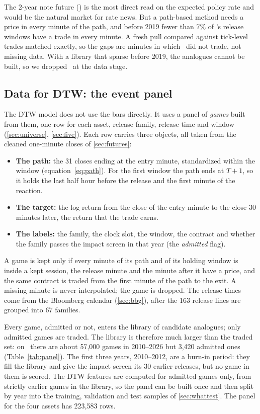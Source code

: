 The 2-year note future (\ZT) is the most direct read on the expected policy rate and would be the
natural market for rate news. But a path-based method needs a price in every minute of the path,
and before 2019 fewer than 7\% of \ZT's release windows have a trade in every minute. A fresh
pull compared against tick-level trades matched exactly, so the gaps are minutes in which \ZT\ did
not trade, not missing data. With a library that sparse before 2019, the analogues cannot be
built, so we dropped \ZT\ at the data stage.

\subsection{Data for DTW: the event panel}\label{sec:dtwdata}

The DTW model does not use the bars directly. It uses a panel of \emph{games} built from them, one
row for each asset, release family, release time and window (\ref{sec:universe}, \ref{sec:five}).
Each row carries three objects, all taken from the cleaned one-minute closes of
\ref{sec:futures}:
\begin{itemize}\itemsep0pt
  \item \textbf{The path:} the 31 closes ending at the entry minute, standardized within the
  window (equation~\eqref{eq:path}). For the first window the path ends at $T+1$, so it holds the
  last half hour before the release and the first minute of the reaction.
  \item \textbf{The target:} the log return from the close of the entry minute to the close 30
  minutes later, the return that the trade earns.
  \item \textbf{The labels:} the family, the clock slot, the window, the contract and whether the
  family passes the impact screen in that year (the \emph{admitted} flag).
\end{itemize}
A game is kept only if every minute of its path and of its holding window is inside a kept session,
the release minute and the minute after it have a price, and the same contract is traded from the
first minute of the path to the exit. A missing minute is never interpolated; the game is dropped.
The release times come from the Bloomberg calendar (\ref{sec:bbg}), after the 163 release lines
are grouped into 67 families.

Every game, admitted or not, enters the library of candidate analogues; only admitted games are
traded. The library is therefore much larger than the traded set: on \ES\ there are about 57,000
games in 2010--2026 but 3,420 admitted ones (Table~\ref{tab:panel}). The first three years,
2010--2012, are a burn-in period: they fill the library and give the impact screen its 30 earlier
releases, but no game in them is scored. The DTW features are computed for admitted games only,
from strictly earlier games in the library, so the panel can be built once and then split by year
into the training, validation and test samples of \ref{sec:whattest}. The panel for the four
assets has 223,583 rows.

